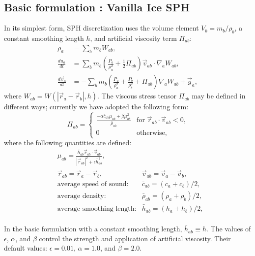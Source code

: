\documentclass[notes.tex]{subfiles}
\begin{document}
\subsection{Basic formulation : Vanilla Ice SPH}
\label{sec:basic_formulation}

In its simplest form, SPH discretization uses the volume element 
$V_b = m_b / \rho_b$, a constant smoothing length $h$, and artificial
viscosity term $\Pi_{ab}$:
\begin{align}
  \rho_a &= \sum_b m_b W_{ab}, 
\\
  \frac{d u_a}{dt}  
      &= \sum_b m_b\left( 
           \frac{P_a}{\rho_a^2} + \frac12\Pi_{ab}
         \right)\vec{v}_{ab} \cdot \nabla_a W_{ab},
\label{eq:basic-dudt}
\\
  \frac{d \vec{v}_a}{d t} &= -\sum_b m_b 
      \left( \frac{P_a}{\rho_a^2} 
           + \frac{P_b}{\rho_b^2} 
           + \Pi_{ab} \right) \nabla_a W_{ab}
       + \vec{g}_a,
\label{eq:basic-dvdt}
\end{align}
where $W_{ab} = W(|\vec{r}_a - \vec{r}_b|,h)$.
The viscous stress tensor $\Pi_{ab}$ may be defined in different ways;
currently we have adopted the following form:
\begin{equation}
\Pi_{ab} = 
\begin{cases}
  \frac{- \alpha \bar{c}_{ab} \mu_{ab} + \beta \mu_{ab}^2}{\bar{\rho}_{ab}} 
    & \text{for $\vec{r}_{ab} \cdot \vec{v}_{ab} < 0$,} \\
  0 & \text{otherwise,}
\end{cases}
\end{equation}
where the following quantities are defined: 
\begin{align}
  &\mu_{ab} = \frac{\bar{h}_{ab} \vec{r}_{ab} \cdot \vec{v}_{ab}}
                   {|\vec{r}_{ab}|^2 + \epsilon \bar{h}_{ab}^2}, 
   \label{eq:visc_mu}\\
  &\vec{r}_{ab} = \vec{r}_a - \vec{r}_b, &\vec{v}_{ab} = \vec{v}_a - \vec{v}_b,\\
  &\text{average speed of sound:} &\bar{c}_{ab} = (c_a + c_b)/2, \\
  &\text{average density:}        &\bar{\rho}_{ab} = (\rho_a + \rho_b)/2,\\
  &\text{average smoothing length:} &\bar{h}_{ab} = (h_a + h_b)/2,\\
\end{align}

In the basic formulation with a constant smoothing length, $\bar{h}_{ab}\equiv h$.
The values of $\epsilon$, $\alpha$, and $\beta$ control the strength and
application of artificial viscosity. Their default values:
$\epsilon = 0.01$, $\alpha = 1.0$, and $\beta = 2.0$.
\end{document}
